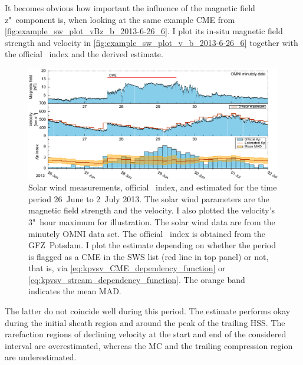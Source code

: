 It becomes obvious how important the influence of the magnetic field z"~component is, when looking at the same example CME from \autoref{fig:example_sw_plot_vBz_b_2013-6-26_6}. I plot its in-situ magnetic field strength and velocity in \autoref{fig:example_sw_plot_v_b_2013-6-26_6} together with the official \Kp{}~index and the derived \Kp{} estimate.
\begin{figure}[htb]
	\centering
	\includegraphics[width=\textwidth]{figures_of_mine/chapter2/example_sw_plot_v_b_2013-6-26_6.pdf}
	\caption[]
	{Solar wind measurements, official \Kp{}~index, and estimated \Kp{} for the time period 26~June to 2~July 2013. The solar wind parameters are the magnetic field strength and the velocity. I also plotted the velocity's 3"~hour maximum for illustration. The solar wind data are from the minutely OMNI data set. The official \Kp{}~index is obtained from the GFZ~Potsdam. I plot the \Kp{} estimate depending on whether the period is flagged as a CME in the SWS list (red line in top panel) or not, that is, via \autoref{eq:kpvsv_CME_dependency_function} or \autoref{eq:kpvsv_stream_dependency_function}. The orange band indicates the mean MAD.}
	\label{fig:example_sw_plot_v_b_2013-6-26_6}
\end{figure}
The latter do not coincide well during this period. The \Kp{} estimate performs okay during the initial sheath region and around the peak of the trailing HSS. The rarefaction regions of declining velocity at the start and end of the considered interval are overestimated, whereas the MC and the trailing compression region are underestimated.\\


